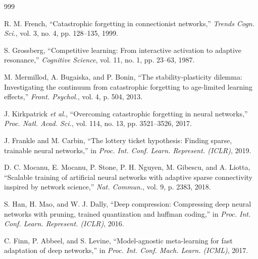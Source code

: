 \documentclass[11pt,a4paper]{article}
\begin{document}
\begin{thebibliography}{999}

R. M. French, ``Catastrophic forgetting in connectionist networks,'' \textit{Trends Cogn. Sci.}, vol. 3, no. 4, pp. 128--135, 1999.




S. Grossberg, ``Competitive learning: From interactive activation to adaptive resonance,'' \textit{Cognitive Science}, vol. 11, no. 1, pp. 23--63, 1987.




M. Mermillod, A. Bugaiska, and P. Bonin, ``The stability-plasticity dilemma: Investigating the continuum from catastrophic forgetting to age-limited learning effects,'' \textit{Front. Psychol.}, vol. 4, p. 504, 2013.




J. Kirkpatrick \textit{et al.}, ``Overcoming catastrophic forgetting in neural networks,'' \textit{Proc. Natl. Acad. Sci.}, vol. 114, no. 13, pp. 3521--3526, 2017.




J. Frankle and M. Carbin, ``The lottery ticket hypothesis: Finding sparse, trainable neural networks,'' in \textit{Proc. Int. Conf. Learn. Represent. (ICLR)}, 2019.




D. C. Mocanu, E. Mocanu, P. Stone, P. H. Nguyen, M. Gibescu, and A. Liotta, ``Scalable training of artificial neural networks with adaptive sparse connectivity inspired by network science,'' \textit{Nat. Commun.}, vol. 9, p. 2383, 2018.




S. Han, H. Mao, and W. J. Dally, ``Deep compression: Compressing deep neural networks with pruning, trained quantization and huffman coding,'' in \textit{Proc. Int. Conf. Learn. Represent. (ICLR)}, 2016.




C. Finn, P. Abbeel, and S. Levine, ``Model-agnostic meta-learning for fast adaptation of deep networks,'' in \textit{Proc. Int. Conf. Mach. Learn. (ICML)}, 2017.




\end{thebibliography}
\end{document}
